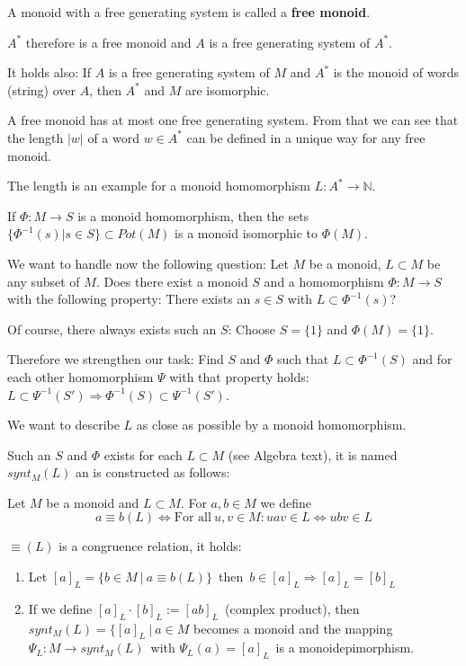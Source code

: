 A monoid with a free generating system is called a {\bf free monoid}.

$A^*$ therefore is a free monoid and $A$ is a free generating system of $A^*$.

It holds also:
If $A$ is a free generating system of $M$ and $A^*$ is the monoid of words
(string) over $A$, then $A^*$ and $M$ are isomorphic.

A free monoid has at most one free generating system. From that we can see that
the length $|w|$ of a word $w \in A^*$ can be defined in a unique way for any
free monoid.

The length is an example for a monoid homomorphism $L : A^* \to \mathbb{N}$.

If $\Phi : M \to S$ is a monoid homomorphism, then the sets $\{ \Phi^{-1}(s) |
s \in S \} \subset Pot(M)$ is a monoid isomorphic to $\Phi(M)$.

We want to handle now the following question: Let $M$ be a monoid, $L \subset M$
be any subset of $M$. Does there exist a monoid $S$ and a homomorphism $\Phi :
M \to S$ with the following property: There exists an $s \in S$ with $L \subset
\Phi^{-1}(s)$?

Of course, there always exists such an $S$: Choose $S = \{1\}$ and $\Phi(M) =
\{1\}$.

Therefore we strengthen our task: Find $S$ and $\Phi$ such that $L \subset
\Phi^{-1}(S)$ and for each other homomorphism $\Psi$ with that property holds:
$L \subset \Psi^{-1}(S') \Rightarrow \Phi^{-1}(S) \subset \Psi^{-1}(S')$.

We want to describe $L$ as close as possible by a monoid homomorphism.

Such an $S$ and $\Phi$ exists for each $L \subset M$ (see Algebra text), it is
named $synt_M(L)$ an is constructed as follows:

\begin{definition}
Let $M$ be a monoid and $L \subset M$. For $a, b \in M$ we define
\[ a \equiv b (L) \Leftrightarrow \mbox{For all}\ u, v \in M: u a v \in L
\Leftrightarrow u b v \in L
\]
\end{definition}

$\equiv (L)$ is a congruence relation, it holds:
\begin{enumerate}
  \item Let $[a]_L = \{ b \in M\ |\ a \equiv b (L) \}$\ then\ $b \in [a]_L
  \Rightarrow [a]_L = [b]_L $
  \item If we define $[a]_L \cdot [b]_L := [a b]_L$\ (complex product), then
  $synt_M(L) = \{ [a]_L\ |\ a \in M$ becomes a monoid and the mapping $\Psi_L :
  M \to synt_M(L)$\ with $\Psi_L(a) = [a]_L$\ is a monoidepimorphism.
\end{enumerate}

